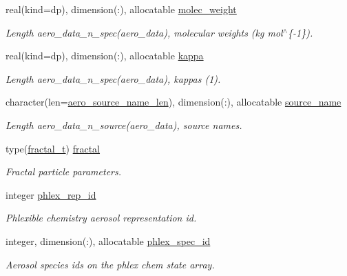\begin{DoxyCompactItemize}
real(kind=dp), dimension(\+:), allocatable \mbox{\hyperlink{structpmc__aero__data_1_1aero__data__t_a1e6d9d31b8ffae0f058fa46ffc4622d6}{molec\+\_\+weight}}
\begin{DoxyCompactList}\small\item\em Length {\ttfamily aero\+\_\+data\+\_\+n\+\_\+spec(aero\+\_\+data)}, molecular weights (kg mol$^\wedge$\{-\/1\}). \end{DoxyCompactList}\item 
real(kind=dp), dimension(\+:), allocatable \mbox{\hyperlink{structpmc__aero__data_1_1aero__data__t_a1a44377e0d260e056ab1ed92dfa0294f}{kappa}}
\begin{DoxyCompactList}\small\item\em Length {\ttfamily aero\+\_\+data\+\_\+n\+\_\+spec(aero\+\_\+data)}, kappas (1). \end{DoxyCompactList}\item 
character(len=\mbox{\hyperlink{namespacepmc__aero__data_adceb28b9bf685995bdcb53cacb52ee42}{aero\+\_\+source\+\_\+name\+\_\+len}}), dimension(\+:), allocatable \mbox{\hyperlink{structpmc__aero__data_1_1aero__data__t_a5a54390ff06344e606f8b4e91af74d68}{source\+\_\+name}}
\begin{DoxyCompactList}\small\item\em Length {\ttfamily aero\+\_\+data\+\_\+n\+\_\+source(aero\+\_\+data)}, source names. \end{DoxyCompactList}\item 
type(\mbox{\hyperlink{structpmc__fractal_1_1fractal__t}{fractal\+\_\+t}}) \mbox{\hyperlink{structpmc__aero__data_1_1aero__data__t_a74d88532c928f879e1e968499fb6e5fa}{fractal}}
\begin{DoxyCompactList}\small\item\em Fractal particle parameters. \end{DoxyCompactList}\item 
integer \mbox{\hyperlink{structpmc__aero__data_1_1aero__data__t_a377ad92d11dddaf84a6be051bd6a3bae}{phlex\+\_\+rep\+\_\+id}}
\begin{DoxyCompactList}\small\item\em Phlexible chemistry aerosol representation id. \end{DoxyCompactList}\item 
integer, dimension(\+:), allocatable \mbox{\hyperlink{structpmc__aero__data_1_1aero__data__t_af2cad1cddc2382a0758b399928e96742}{phlex\+\_\+spec\+\_\+id}}
\begin{DoxyCompactList}\small\item\em Aerosol species ids on the phlex chem state array. \end{DoxyCompactList}\end{DoxyCompactItemize}


